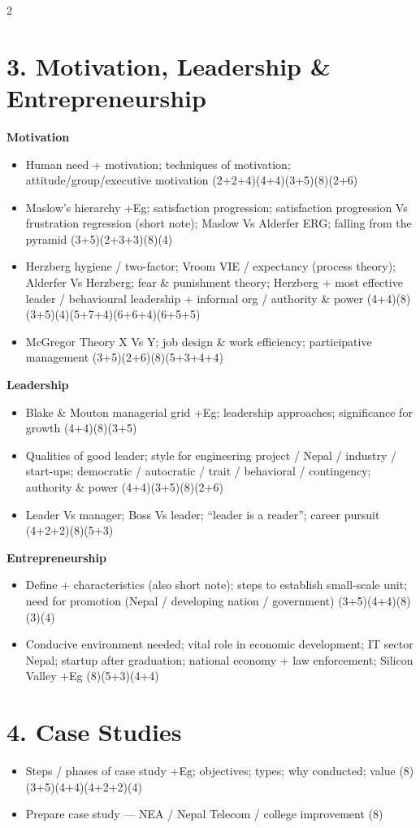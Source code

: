 \documentclass[10pt]{article}
\begin{document}
\begin{multicols}{2}
\section*{3. Motivation, Leadership \& Entrepreneurship}
\textbf{Motivation}
\begin{itemize}
  \item Human need + motivation; techniques of motivation; attitude/group/executive motivation \hfill (2+2+4)(4+4)(3+5)(8)(2+6)
  \item Maslow's hierarchy +Eg; satisfaction progression; satisfaction progression Vs frustration regression (short note); Maslow Vs Alderfer ERG; falling from the pyramid \hfill (3+5)(2+3+3)(8)(4)
  \item Herzberg hygiene / two-factor; Vroom VIE / expectancy (process theory); Alderfer Vs Herzberg; fear \& punishment theory; Herzberg + most effective leader / behavioural leadership + informal org / authority \& power \hfill (4+4)(8)(3+5)(4)(5+7+4)(6+6+4)(6+5+5)
  \item McGregor Theory X Vs Y; job design \& work efficiency; participative management \hfill (3+5)(2+6)(8)(5+3+4+4)
\end{itemize}
\textbf{Leadership}
\begin{itemize}
  \item Blake \& Mouton managerial grid +Eg; leadership approaches; significance for growth \hfill (4+4)(8)(3+5)
  \item Qualities of good leader; style for engineering project / Nepal / industry / start-ups; democratic / autocratic / trait / behavioral / contingency; authority \& power \hfill (4+4)(3+5)(8)(2+6)
  \item Leader Vs manager; Boss Vs leader; ``leader is a reader''; career pursuit \hfill (4+2+2)(8)(5+3)
\end{itemize}
\textbf{Entrepreneurship}
\begin{itemize}
  \item Define + characteristics (also short note); steps to establish small-scale unit; need for promotion (Nepal / developing nation / government) \hfill (3+5)(4+4)(8)(3)(4)
  \item Conducive environment needed; vital role in economic development; IT sector Nepal; startup after graduation; national economy + law enforcement; Silicon Valley +Eg \hfill (8)(5+3)(4+4)
\end{itemize}

\section*{4. Case Studies}
\begin{itemize}
  \item Steps / phases of case study +Eg; objectives; types; why conducted; value \hfill (8)(3+5)(4+4)(4+2+2)(4)
  \item Prepare case study --- NEA / Nepal Telecom / college improvement \hfill (8)
\end{itemize}


\end{multicols}
\end{document}

